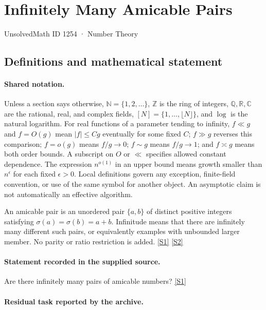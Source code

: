 \documentclass[11pt,a4paper]{article}
\newcommand{\N}{\mathbb{N}}
\newcommand{\Z}{\mathbb{Z}}
\newcommand{\Q}{\mathbb{Q}}
\newcommand{\R}{\mathbb{R}}
\newcommand{\C}{\mathbb{C}}
\newcommand{\sref}[2]{\hyperlink{source:#1:#2}{[S#2]}}
\begin{document}

\setcounter{section}{1253}

\section{Infinitely Many Amicable Pairs}\label{1254}

{\small\sffamily UnsolvedMath ID 1254 · Number Theory}

\subsection{Definitions and mathematical statement}

\paragraph{Shared notation.}Unless a section says otherwise, $\N=\{1,2,\ldots\}$,
$\Z$ is the ring of integers, $\Q,\R,\C$ are the rational, real, and complex
fields, $[N]=\{1,\ldots,\lfloor N\rfloor\}$, and $\log$ is the natural
logarithm. For real functions of a parameter tending to infinity,
$f\ll g$ and $f=O(g)$ mean $|f|\leq Cg$ eventually for some fixed $C$;
$f\gg g$ reverses this comparison; $f=o(g)$ means $f/g\to0$;
$f\sim g$ means $f/g\to1$; and $f\asymp g$ means both order bounds.
A subscript on $O$ or $\ll$ specifies allowed constant dependence.
The expression $n^{o(1)}$ in an upper bound means growth smaller than
$n^\epsilon$ for each fixed $\epsilon>0$. Local definitions govern any
exception, finite-field convention, or use of the same symbol for another
object. An asymptotic claim is not automatically an effective algorithm.



An amicable pair is an unordered pair $\{a,b\}$ of distinct positive integers satisfying $\sigma(a)=\sigma(b)=a+b$. Infinitude means that there are infinitely many different such pairs, or equivalently examples with unbounded larger member. No parity or ratio restriction is added. \sref{1254}{1} \sref{1254}{2}

\paragraph{Statement recorded in the supplied source.}
Are there infinitely many pairs of amicable numbers? \sref{1254}{1}

\paragraph{Residual task reported by the archive.}
\end{document}

